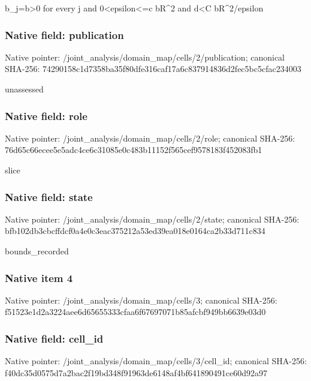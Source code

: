 \documentclass[10pt,a4paper]{article}
\begin{document}
\begingroup\raggedright\sloppy b\_\allowbreak{}j=\allowbreak{}b>0 for every j and 0<epsilon<=\allowbreak{}c bR\textasciicircum{}2 and d<C bR\textasciicircum{}2/\allowbreak{}epsilon\par\endgroup

\subsubsection{Native field: publication}
Native pointer: /joint\_\allowbreak{}analysis/domain\_\allowbreak{}map/cells/2/publication; canonical SHA-256: 74290158c1d7358ba35f80dfe316caf17a6c837914836d2fec5bc5cfac234003

\begingroup\raggedright\sloppy unassessed\par\endgroup

\subsubsection{Native field: role}
Native pointer: /joint\_\allowbreak{}analysis/domain\_\allowbreak{}map/cells/2/role; canonical SHA-256: 76d65c66ecee5e5adc4ce6c31085e0c483b11152f565cef9578183f452083fb1

\begingroup\raggedright\sloppy slice\par\endgroup

\subsubsection{Native field: state}
Native pointer: /joint\_\allowbreak{}analysis/domain\_\allowbreak{}map/cells/2/state; canonical SHA-256: bfb102db3cbcffdcf0a4e0c3eac375212a53ed39ea018e0164ca2b33d711c834

\begingroup\raggedright\sloppy bounds\_\allowbreak{}recorded\par\endgroup

\subsubsection{Native item 4}
Native pointer: /joint\_\allowbreak{}analysis/domain\_\allowbreak{}map/cells/3; canonical SHA-256: f51523e1d2a3224aee6d65655333cfaa6f67697071b85afcbf949bb6639e03d0

\subsubsection{Native field: cell\_\allowbreak{}id}
Native pointer: /joint\_\allowbreak{}analysis/domain\_\allowbreak{}map/cells/3/cell\_\allowbreak{}id; canonical SHA-256: f40dc35d0575d7a2bac2f19bd348f91963de6148af4bf641890491ce60d92a97
\end{document}
